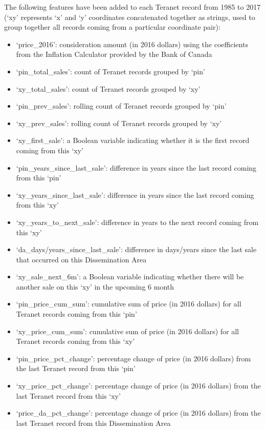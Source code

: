 The following features have been added to each Teranet record from 1985 to 2017 (`xy' represents `x' and `y' coordinates concatenated together as strings, used to group together all records coming from a particular coordinate pair):

\begin{itemize}
    \item `price\_2016': consideration amount (in 2016 dollars) using the coefficients from the Inflation Calculator provided by the Bank of Canada\cite{BankofCanada2019}
    \item `pin\_total\_sales': count of Teranet records grouped by `pin'
    \item `xy\_total\_sales': count of Teranet records grouped by `xy'
    \item `pin\_prev\_sales': rolling count of Teranet records grouped by `pin'
    \item `xy\_prev\_sales': rolling count of Teranet records grouped by `xy'
    \item `xy\_first\_sale': a Boolean variable indicating whether it is the first record coming from this `xy'
    \item `pin\_years\_since\_last\_sale': difference in years since the last record coming from this `pin'
    \item `xy\_years\_since\_last\_sale': difference in years since the last record coming from this `xy'
    \item `xy\_years\_to\_next\_sale': difference in years to the next record coming from this `xy'
    \item `da\_days/years\_since\_last\_sale': difference in days/years since the last sale that occurred on this Dissemination Area
    \item `xy\_sale\_next\_6m': a Boolean variable indicating whether there will be another sale on this `xy' in the upcoming 6 month
    \item `pin\_price\_cum\_sum': cumulative sum of price (in 2016 dollars) for all Teranet records coming from this `pin'
    \item `xy\_price\_cum\_sum': cumulative sum of price (in 2016 dollars) for all Teranet records coming from this `xy'
    \item `pin\_price\_pct\_change': percentage change of price (in 2016 dollars) from the last Teranet record from this `pin'
    \item `xy\_price\_pct\_change': percentage change of price (in 2016 dollars) from the last Teranet record from this `xy'
    \item `price\_da\_pct\_change': percentage change of price (in 2016 dollars) from the last Teranet record from this Dissemination Area

\end{itemize}
